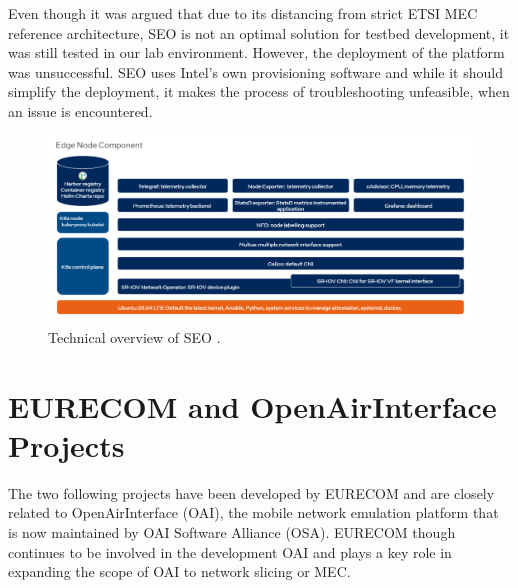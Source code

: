 \documentclass[12pt,a4paper,twoside]{report}
\begin{document}
Even though it was argued that due to its distancing from strict ETSI MEC reference architecture, SEO is not an optimal solution for testbed development, it was still tested in our lab environment. However, the deployment of the platform was unsuccessful. SEO uses Intel’s own provisioning software and while it should simplify the deployment, it makes the process of troubleshooting unfeasible, when an issue is encountered.
\begin{figure}[ht]
	\centering
	\includegraphics[width=13cm]{./images/intel-seo.png} 
	\caption{Technical overview of SEO \cite{seo-doc}.}
	\label{F:seo}
\end{figure}

\section{EURECOM and OpenAirInterface Projects}
The two following projects have been developed by EURECOM and are closely related to OpenAirInterface (OAI), the mobile network emulation platform that is now maintained by OAI Software Alliance (OSA). EURECOM though continues to be involved in the development OAI and plays a key role in expanding the scope of OAI to network slicing or MEC.
\end{document}
